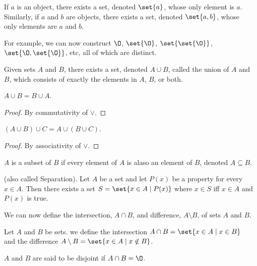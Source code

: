 \begin{axiom}[Pairing] \label{def:zfc:pairing}
    If $a$ is an object, there exists a set, denoted $\set{a}$, whose only
    element is $a$.
    Similarly, if $a$ and $b$ are objects, there exists a set, denoted
    $\set{a, b}$, whose only elements are $a$ and $b$.
\end{axiom}
For example, we can now construct $\O$, $\set{\O}$, $\set{\set{\O}}$,
$\set{\O, \set{\O}}$, etc, all of which are distinct.

\begin{axiom} \label{def:zfc:pairwise_union}
    Given sets $A$ and $B$, there exists a set, denoted $A \cup B$, called the
    union of $A$ and $B$, which consists of exactly the elements in $A$, $B$, or
    both.
\end{axiom}

\begin{exercise}
    $A \cup B = B \cup A$.
\end{exercise}
\begin{proof}
    By commutativity of $\lor$.
\end{proof}
\begin{exercise}
    $(A \cup B) \cup C = A \cup (B \cup C)$.
\end{exercise}
\begin{proof}
    By associativity of $\lor$.
\end{proof}

\begin{definition}[Subset] \label{def:zfc:subset}
    $A$ is a subset of $B$ if every element of $A$ is alaso an element of $B$,
    denoted $A \subseteq B$.
\end{definition}

\begin{axiom}[Specification] \label{def:zfc:specification}
    (also called Separation).
    Let $A$ be a set and let $P(x)$ be a property for every $x \in A$.
    Then there exists a set $S = \set{x \in A \mid P(x)}$ where $x \in S$ iff
    $x \in A$ and $P(x)$ is true.
\end{axiom}
We can now define the intersection, $A \cap B$, and difference, $A \setminus B$,
of sets $A$ and $B$.
\begin{definition}
    Let $A$ and $B$ be sets.
    we define the intersection $A \cap B = \set{x \in A \mid x \in B}$ and the
    difference $A \setminus B = \set{x \in A \mid x \notin B}$.

    $A$ and $B$ are said to be disjoint if $A \cap B = \O$.
\end{definition}

